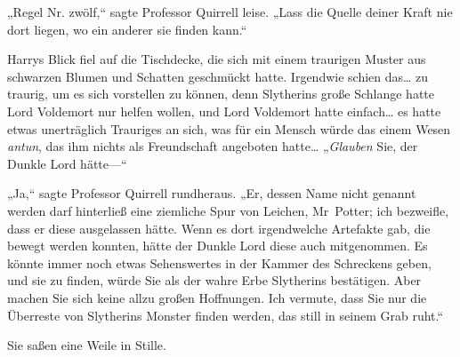 „Regel Nr. zwölf,“ sagte Professor Quirrell leise. „Lass die Quelle deiner Kraft nie dort liegen, wo ein anderer sie finden kann.“

Harrys Blick fiel auf die Tischdecke, die sich mit einem traurigen Muster aus schwarzen Blumen und Schatten geschmückt hatte. Irgendwie schien das… zu traurig, um es sich vorstellen zu können, denn Slytherins große Schlange hatte Lord Voldemort nur helfen wollen, und Lord Voldemort hatte einfach… es hatte etwas unerträglich Trauriges an sich, was für ein Mensch würde das einem Wesen \emph{antun}, das ihm nichts als Freundschaft angeboten hatte… „\emph{Glauben} Sie, der Dunkle Lord hätte—“

„Ja,“ sagte Professor Quirrell rundheraus. „Er, dessen Name nicht genannt werden darf hinterließ eine ziemliche Spur von Leichen, Mr~Potter; ich bezweifle, dass er diese ausgelassen hätte. Wenn es dort irgendwelche Artefakte gab, die bewegt werden konnten, hätte der Dunkle Lord diese auch mitgenommen. Es könnte immer noch etwas Sehenswertes in der Kammer des Schreckens geben, und sie zu finden, würde Sie als der wahre Erbe Slytherins bestätigen. Aber machen Sie sich keine allzu großen Hoffnungen. Ich vermute, dass Sie nur die Überreste von Slytherins Monster finden werden, das still in seinem Grab ruht.“

Sie saßen eine Weile in Stille.

